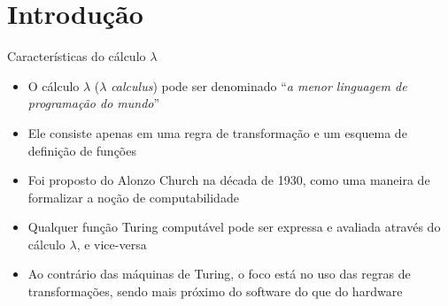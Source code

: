 \section{Introdução}

\begin{frame}[fragile]{Características do cálculo $\lambda$}

    \begin{itemize}
        \item O cálculo $\lambda$ ($\lambda$ \textit{calculus}) pode ser denominado 
            ``\textit{a menor linguagem de programação do mundo}''

        \item Ele consiste apenas em uma regra de transformação e um esquema de definição de 
            funções

        \item Foi proposto do Alonzo Church na década de 1930, como uma maneira de formalizar a
            noção de computabilidade

        \item Qualquer função Turing computável pode ser expressa e avaliada através do cálculo 
            $\lambda$, e vice-versa
            
        \item Ao contrário das máquinas de Turing, o foco está no uso das regras de transformações, 
            sendo mais próximo do software do que do hardware
    \end{itemize}

\end{frame}

